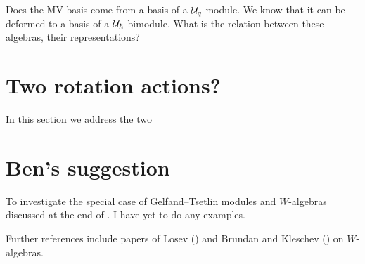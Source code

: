 \documentclass[11pt]{article}
\begin{document}
Does the MV basis come from a basis of a $\mathcal U_q$-module. We know that it can be deformed to a basis of a $\mathcal U_\hbar$-bimodule. What is the relation between these algebras, their representations? 


\begin{comment}
{\color{red} Joel says:} what do you mean by the $ \CC^\times$ action and the $ T$ action?  Careful that you are not getting confused with the actioin on the MV cycles (the action used for the multidegrees).  There is a $ T $ action on $L(\lambda)$ and one on $ \CC[N]$, and the map $ L(\lambda) \rightarrow \CC[N]$ is equivariant, up to a character.

It may be helpful to recall that if $Z$ is stable of type $\nu$ then $b_Z$ is unique such that whenever $\nu + \mu \in P_+$ 
$$
t^\mu Z \subset \overline{\Gr^{\nu + \mu }} \Rightarrow b_Z = \Psi_{\nu + \mu}([t^\mu Z])
$$
\end{comment}

\section{Two rotation actions?}
% 
In this section we address the two  

\section{Ben's suggestion} 
To investigate the special case of  Gelfand--Tsetlin modules and $W$-algebras discussed at the end of \cite{kamnitzer2019category}. I have yet to do any examples. 

Further references include papers of Losev (\cite{losev2010finite,losev2010quantized,losev2011finite}) and Brundan and Kleschev (\cite{brundan2006shifted,brundan2009blocks}) on $W$-algebras.
%
%


%
%


%
\end{document}
